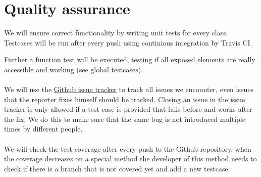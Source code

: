 \chapter{Quality assurance}
We will ensure correct functionality by writing unit tests for every class. Testcases will be run after every push using continious integration by Travis CI.

Further a function test will be executed, testing if all exposed elements are really accessible and working (see global testcases).
\\\\
We will use the \hyperlink{https://github.com/rootjs/rootjs/issues }{Github issue tracker} to track all issues we encounter, even issues that the reporter fixes himself should be tracked.
Closing an issue in the issue tracker is only allowed if a test case is provided that fails before and works after the fix. We do this to make sure that the same bug is not introduced multiple times by different people.
\\\\
We will check the test coverage after every push to the Github repository, when the coverage decreases on a special method the developer of this method needs to check if there is a branch that is not covered yet and add a new testcase.
